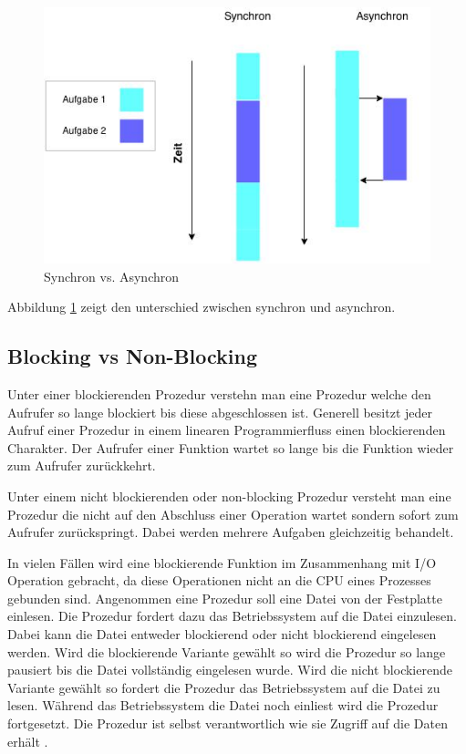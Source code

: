 \begin{figure}[!htb]
  \centering
  \includegraphics[width=13cm]{images/synchron_vs_asynchron.jpg}
  \caption{
    Synchron vs. Asynchron
  }
  \label{figure:syncron_vs_async}
\end{figure}

Abbildung \ref{figure:syncron_vs_async} zeigt den unterschied zwischen synchron und asynchron. 

\subsection{Blocking vs Non-Blocking}

Unter einer blockierenden Prozedur verstehn man eine Prozedur welche den Aufrufer so lange blockiert bis diese abgeschlossen ist. Generell besitzt jeder Aufruf einer Prozedur in einem linearen Programmierfluss einen blockierenden Charakter. Der Aufrufer einer Funktion wartet so lange bis die Funktion wieder zum Aufrufer zurückkehrt. 

Unter einem nicht blockierenden oder non-blocking Prozedur versteht man eine Prozedur die nicht auf den Abschluss einer Operation wartet sondern sofort zum Aufrufer zurückspringt. Dabei werden mehrere Aufgaben gleichzeitig behandelt.  

In vielen Fällen wird eine blockierende Funktion im Zusammenhang mit I/O Operation gebracht, da diese Operationen nicht an die CPU eines Prozesses gebunden sind. Angenommen eine Prozedur soll eine Datei von der Festplatte einlesen. Die Prozedur fordert dazu das Betriebssystem auf die Datei einzulesen. Dabei kann die Datei entweder blockierend oder nicht blockierend eingelesen werden. Wird die blockierende Variante gewählt so wird die Prozedur so lange pausiert bis die Datei vollständig eingelesen wurde. Wird die nicht blockierende Variante gewählt so fordert die Prozedur das Betriebssystem auf die Datei zu lesen. Während das Betriebssystem die Datei noch einliest wird die Prozedur fortgesetzt. Die Prozedur ist selbst verantwortlich wie sie Zugriff auf die Daten erhält \cite[p. 47]{Erb2012}.

